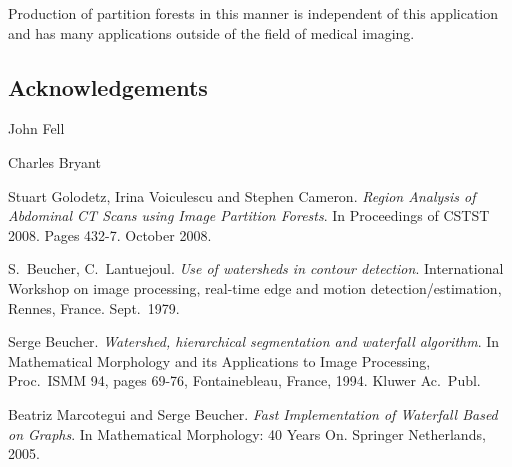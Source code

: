 \documentclass{jfp}
\begin{document}
Production of partition forests in this manner is independent of this
application and has many applications outside of the field of medical
imaging.

\subsection{Acknowledgements}

John Fell

Charles Bryant




\begin{thebibliography}{99}

 Stuart Golodetz, Irina Voiculescu
  and Stephen Cameron.  {\em Region Analysis of Abdominal CT Scans
    using Image Partition Forests}. In Proceedings of CSTST
  2008. Pages 432-7. October 2008.

 S.\ Beucher, C.\ Lantuejoul. {\em
  Use of watersheds in contour detection}. International Workshop on
  image processing, real-time edge and motion detection/estimation,
  Rennes, France. Sept.\ 1979.

 Serge Beucher. {\em Watershed,
  hierarchical segmentation and waterfall algorithm}. In Mathematical
  Morphology and its Applications to Image Processing, Proc.\ ISMM 94,
  pages 69-76, Fontainebleau, France, 1994. Kluwer Ac.\ Publ.

 Beatriz Marcotegui and Serge Beucher. {\em Fast
  Implementation of Waterfall Based on Graphs}. In {Mathematical
  Morphology: 40 Years On}. Springer Netherlands, 2005.

\end{thebibliography}
\end{document}
